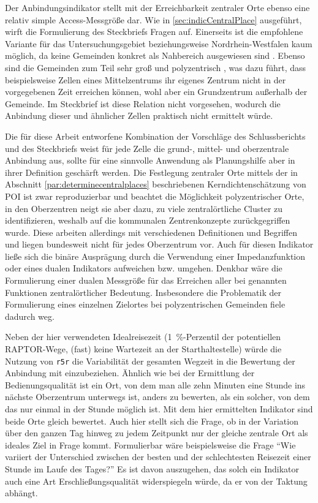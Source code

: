 \documentclass[11pt,pdftex,a4paper]{scrartcl}
\begin{document}
	Der Anbindungsindikator stellt mit der Erreichbarkeit zentraler Orte ebenso eine relativ simple Access-Messgröße dar. Wie in \ref{sec:indicCentralPlace} ausgeführt, wirft die Formulierung des Steckbriefs Fragen auf. Einerseits ist die empfohlene Variante für das Untersuchungsgebiet beziehungsweise Nordrhein-Westfalen kaum möglich, da keine Gemeinden konkret als Nahbereich ausgewiesen sind \parencites[181--191]{MWIKENRWLandesentwicklungsplanNordrheinWestfalen2024}. Ebenso sind die Gemeinden zum Teil sehr groß und polyzentrisch \parencite[vgl.][16]{blotevogelZentraleOrteZur1996}, was dazu führt, dass beispielsweise Zellen eines Mittelzentrums ihr eigenes Zentrum nicht in der vorgegebenen Zeit erreichen können, wohl aber ein Grundzentrum außerhalb der Gemeinde. Im Steckbrief ist diese Relation nicht vorgesehen, wodurch die Anbindung dieser und ähnlicher Zellen praktisch nicht ermittelt würde.
		
	Die für diese Arbeit entworfene Kombination der Vorschläge des Schlussberichts und des Steckbriefs weist für jede Zelle die grund-, mittel- und oberzentrale Anbindung aus, sollte für eine sinnvolle Anwendung als Planungshilfe aber in ihrer Definition geschärft werden. Die Festlegung zentraler Orte mittels der in Abschnitt \ref{par:determinecentralplaces} beschriebenen Kerndichtenschätzung von POI ist zwar reproduzierbar und beachtet die Möglichkeit polyzentrischer Orte, in den Oberzentren neigt sie aber dazu, zu viele zentralörtliche Cluster zu identifizieren, weshalb auf die kommunalen Zentrenkonzepte zurückgegriffen wurde. Diese arbeiten allerdings mit verschiedenen Definitionen und Begriffen und liegen bundesweit nicht für jedes Oberzentrum vor. Auch für diesen Indikator ließe sich die binäre Ausprägung durch die Verwendung einer Impedanzfunktion oder eines dualen Indikators aufweichen bzw. umgehen. Denkbar wäre die Formulierung einer dualen Messgröße für das Erreichen aller bei \parencite{Flex2016} genannten Funktionen zentralörtlicher Bedeutung. Insbesondere die Problematik der Formulierung eines einzelnen Zielortes bei polyzentrischen Gemeinden fiele dadurch weg.
	
	Neben der hier verwendeten Idealreisezeit (\SI{1}{\percent}-Perzentil der potentiellen RAPTOR-Wege, (fast) keine Wartezeit an der Starthaltestelle) würde die Nutzung von \texttt{r5r} die Variabilität der gesamten Wegzeit in die Bewertung der Anbindung mit einzubeziehen. Ähnlich wie bei der Ermittlung der Bedienungsqualität ist ein Ort, von dem man alle zehn Minuten eine Stunde ins nächste Oberzentrum unterwegs ist, anders zu bewerten, als ein solcher, von dem das nur einmal in der Stunde möglich ist. Mit dem hier ermittelten Indikator sind beide Orte gleich bewertet. Auch hier stellt sich die Frage, ob in der Variation über den ganzen Tag hinweg zu jedem Zeitpunkt nur der gleiche zentrale Ort als ideales Ziel in Frage kommt. Formulierbar wäre beispielsweise die Frage \enquote{Wie variiert der Unterschied zwischen der besten und der schlechtesten Reisezeit einer Stunde im Laufe des Tages?} Es ist davon auszugehen, das solch ein Indikator auch eine Art Erschließungsqualität widerspiegeln würde, da er von der Taktung abhängt.
	\pagebreak
\end{document}
